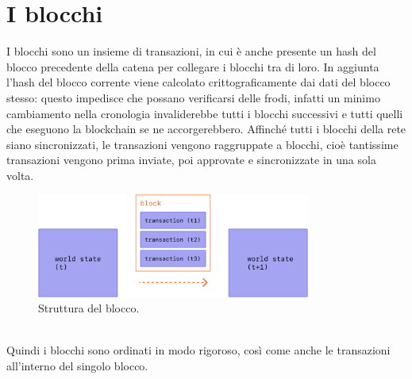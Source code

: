 \documentclass[a4paper,11pt]{report}
\begin{document}
\section{I blocchi}
I blocchi sono un insieme di transazioni, in cui è anche presente un hash del blocco precedente della catena per collegare i blocchi tra di loro. In aggiunta l'hash del blocco corrente viene calcolato crittograficamente dai dati del blocco stesso: questo impedisce che possano verificarsi delle frodi, infatti un minimo cambiamento nella cronologia invaliderebbe tutti i blocchi successivi e tutti quelli che eseguono la blockchain se ne accorgerebbero.
Affinché tutti i blocchi della rete siano sincronizzati, le transazioni vengono raggruppate a blocchi, cioè tantissime transazioni vengono prima inviate, poi approvate e sincronizzate in una sola volta.\\
\begin{figure}[htbp] 
\begin{center}
\includegraphics[width=9cm]{img/tx-block.png} 
\end{center}
\caption{Struttura del blocco. \cite{ether}}
\end{figure}
\\Quindi i blocchi sono ordinati in modo rigoroso, così come anche le transazioni all'interno del singolo blocco.

\newpage
\end{document}

